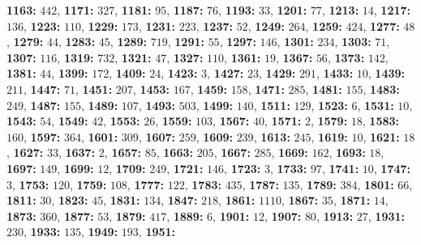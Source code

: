 \textsf{\bfseries 1163:} $442$, \textsf{\bfseries 1171:} $327$, \textsf{\bfseries 1181:} $95$, \textsf{\bfseries 1187:} $76$, \textsf{\bfseries 1193:} $33$, \textsf{\bfseries 1201:} $77$, \textsf{\bfseries 1213:} $14$, \textsf{\bfseries 1217:} $136$, \textsf{\bfseries 1223:} $110$, \textsf{\bfseries 1229:} $173$, 
\textsf{\bfseries 1231:} $223$, \textsf{\bfseries 1237:} $52$, \textsf{\bfseries 1249:} $264$, \textsf{\bfseries 1259:} $424$, \textsf{\bfseries 1277:} $48$, \textsf{\bfseries 1279:} $44$, \textsf{\bfseries 1283:} $45$, \textsf{\bfseries 1289:} $719$, \textsf{\bfseries 1291:} $55$, \textsf{\bfseries 1297:} $146$, \textsf{\bfseries 1301:} $234$, \textsf{\bfseries 1303:} $71$, \textsf{\bfseries 1307:} $116$, \textsf{\bfseries 1319:} $732$, \textsf{\bfseries 1321:} $47$, \textsf{\bfseries 1327:} $110$, \textsf{\bfseries 1361:} $19$, \textsf{\bfseries 1367:} $56$, \textsf{\bfseries 1373:} $142$, \textsf{\bfseries 1381:} $44$, \textsf{\bfseries 1399:} $172$, \textsf{\bfseries 1409:} $24$, \textsf{\bfseries 1423:} $3$, \textsf{\bfseries 1427:} $23$, \textsf{\bfseries 1429:} $291$, \textsf{\bfseries 1433:} $10$, \textsf{\bfseries 1439:} $211$, \textsf{\bfseries 1447:} $71$, \textsf{\bfseries 1451:} $207$, \textsf{\bfseries 1453:} $167$, \textsf{\bfseries 1459:} $158$, \textsf{\bfseries 1471:} $285$, \textsf{\bfseries 1481:} $155$, \textsf{\bfseries 1483:} $249$, \textsf{\bfseries 1487:} $155$, \textsf{\bfseries 1489:} $107$, \textsf{\bfseries 1493:} $503$, \textsf{\bfseries 1499:} $140$, \textsf{\bfseries 1511:} $129$, \textsf{\bfseries 1523:} $6$, \textsf{\bfseries 1531:} $10$, \textsf{\bfseries 1543:} $54$, \textsf{\bfseries 1549:} $42$, \textsf{\bfseries 1553:} $26$, \textsf{\bfseries 1559:} $103$, \textsf{\bfseries 1567:} $40$, \textsf{\bfseries 1571:} $2$, \textsf{\bfseries 1579:} $18$, \textsf{\bfseries 1583:} $160$, \textsf{\bfseries 1597:} $364$, \textsf{\bfseries 1601:} $309$, \textsf{\bfseries 1607:} $259$, \textsf{\bfseries 1609:} $239$, \textsf{\bfseries 1613:} $245$, \textsf{\bfseries 1619:} $10$, \textsf{\bfseries 1621:} $18$, \textsf{\bfseries 1627:} $33$, \textsf{\bfseries 1637:} $2$, \textsf{\bfseries 1657:} $85$, \textsf{\bfseries 1663:} $205$, \textsf{\bfseries 1667:} $285$, \textsf{\bfseries 1669:} $162$, \textsf{\bfseries 1693:} $18$, \textsf{\bfseries 1697:} $149$, \textsf{\bfseries 1699:} $12$, \textsf{\bfseries 1709:} $249$, \textsf{\bfseries 1721:} $146$, \textsf{\bfseries 1723:} $3$, \textsf{\bfseries 1733:} $97$, \textsf{\bfseries 1741:} $10$, \textsf{\bfseries 1747:} $3$, \textsf{\bfseries 1753:} $120$, \textsf{\bfseries 1759:} $108$, \textsf{\bfseries 1777:} $122$, \textsf{\bfseries 1783:} $435$, \textsf{\bfseries 1787:} $135$, \textsf{\bfseries 1789:} $384$, \textsf{\bfseries 1801:} $66$, \textsf{\bfseries 1811:} $30$, \textsf{\bfseries 1823:} $45$, \textsf{\bfseries 1831:} $134$, \textsf{\bfseries 1847:} $218$, \textsf{\bfseries 1861:} $1110$, \textsf{\bfseries 1867:} $35$, \textsf{\bfseries 1871:} $14$, \textsf{\bfseries 1873:} $360$, \textsf{\bfseries 1877:} $53$, \textsf{\bfseries 1879:} $417$, \textsf{\bfseries 1889:} $6$, \textsf{\bfseries 1901:} $12$, \textsf{\bfseries 1907:} $80$, \textsf{\bfseries 1913:} $27$, \textsf{\bfseries 1931:} $230$, \textsf{\bfseries 1933:} $135$, \textsf{\bfseries 1949:} $193$, \textsf{\bfseries 1951:} 
